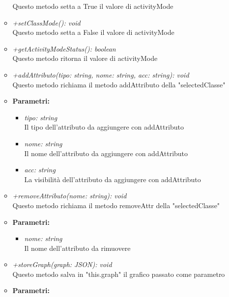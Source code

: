 \begin{itemize}
\begin{itemize}
          				Questo metodo setta a True il valore di activityMode
          				\item \emph{+setClassMode(): void}\\
          				Questo metodo setta a False il valore di activityMode
          				\item \emph{+getActivityModeStatus(): boolean}\\
          				Questo metodo ritorna il valore di activityMode
          				\item \emph{+addAttributo(tipo: string, nome: string, acc: string): void}\\
          				Questo metodo richiama il metodo addAttributo della "selectedClasse"
          				\item \textbf{Parametri:}\\
            				\begin{itemize}
            					\item \emph{tipo: string}\\
            					Il tipo dell'attributo da aggiungere con addAttributo
            					\item \emph{nome: string}\\
            					Il nome dell'attributo da aggiungere con addAttributo
            					\item \emph{acc: string}\\
            					La visibilità dell'attributo da aggiungere con addAttributo
            				\end{itemize}
            			\item \emph{+removeAttributo(nome: string): void}\\
          				Questo metodo richiama il metodo removeAttr della "selectedClasse"
          				\item \textbf{Parametri:}\\
            				\begin{itemize}
            					\item \emph{nome: string}\\
            					Il nome dell'attributo da rimuovere
            				\end{itemize}
            			\item \emph{+storeGraph(graph: JSON): void}\\
          				Questo metodo salva in "this.graph" il grafico passato come parametro
          				\item \textbf{Parametri:}\\
            				\begin{itemize}

\end{itemize}
\end{itemize}
\end{itemize}
